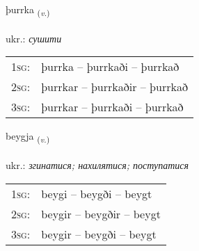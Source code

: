 \documentclass[frontgrid, backgrid]{flacards}\usepackage[]{graphicx}\usepackage[]{xcolor}
\begin{document}
\renewcommand{\flhead}{\vskip5pt \fboxsep=0pt {\small\bfseries\footnotesize Sagnorð | дієслово}}
\renewcommand{\fcfoot}{\vskip5pt \fboxsep=0pt \hspace{2pt}{\small\bfseries\footnotesize 3K}}

\renewcommand{\blhead}{\vskip5pt {\small\bfseries\footnotesize Sagnorð | дієслово }}
\renewcommand{\bcfoot}{\vskip5pt \hspace{2pt}{\small\bfseries\footnotesize 3K}}


{þurrka \small{\textsubscript{(\textit{v.})}} \\[1ex] %
\textphonetic{[θʏr̥ka]} \\
ukr.: \emph{сушити} \\  [2ex]
\renewcommand*{\arraystretch}{0.8}
\begin{tabular}{p{1cm}l}
\textsc{1sg}: & þurrka -- þurrkaði -- þurrkað \\ 
\textsc{2sg}: & þurrkar -- þurrkaðir -- þurrkað \\ 
\textsc{3sg}: & þurrkar -- þurrkaði -- þurrkað \\ 
\end{tabular}
}

\renewcommand{\flhead}{\vskip5pt \fboxsep=0pt {\small\bfseries\footnotesize Sagnorð | дієслово}}
\renewcommand{\fcfoot}{\vskip5pt \fboxsep=0pt \hspace{2pt}{\small\bfseries\footnotesize 3K}}

\renewcommand{\blhead}{\vskip5pt {\small\bfseries\footnotesize Sagnorð | дієслово }}
\renewcommand{\bcfoot}{\vskip5pt \hspace{2pt}{\small\bfseries\footnotesize 3K}}


{beygja \small{\textsubscript{(\textit{v.})}} \\[1ex] %
\textphonetic{[peija]} \\
ukr.: \emph{згинатися; нахилятися; поступатися} \\  [2ex]
\renewcommand*{\arraystretch}{0.8}
\begin{tabular}{p{1cm}l}
\textsc{1sg}: & beygi -- beygði -- beygt \\ 
\textsc{2sg}: & beygir -- beygðir -- beygt \\ 
\textsc{3sg}: & beygir -- beygði -- beygt \\ 
\end{tabular}
}
\end{document}
